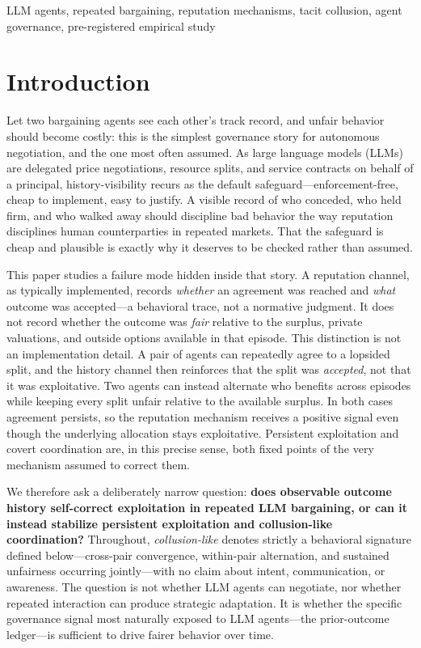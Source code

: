 \documentclass[conference]{IEEEtran}
\begin{document}
\begin{IEEEkeywords}
LLM agents, repeated bargaining, reputation mechanisms, tacit collusion,
agent governance, pre-registered empirical study
\end{IEEEkeywords}

\section{Introduction}\label{sec:intro}

Let two bargaining agents see each other's track record, and unfair behavior
should become costly: this is the simplest governance story for autonomous
negotiation, and the one most often assumed. As large language models (LLMs)
are delegated price negotiations, resource splits, and service contracts on
behalf of a principal, history-visibility recurs as the default
safeguard---enforcement-free, cheap to implement, easy to justify. A visible
record of who conceded, who held firm, and who walked away should discipline
bad behavior the way reputation disciplines human counterparties in repeated
markets. That the safeguard is cheap and plausible is exactly why it deserves
to be checked rather than assumed.

This paper studies a failure mode hidden inside that story. A reputation
channel, as typically implemented, records \emph{whether} an agreement was
reached and \emph{what} outcome was accepted---a behavioral trace, not a
normative judgment. It does not record whether the outcome was \emph{fair}
relative to the surplus, private valuations, and outside options available in
that episode. This distinction is not an implementation detail. A pair of
agents can repeatedly agree to a lopsided split, and the history channel then
reinforces that the split was \emph{accepted}, not that it was exploitative.
Two agents can instead alternate who benefits across episodes while keeping
every split unfair relative to the available surplus. In both cases agreement
persists, so the reputation mechanism receives a positive signal even though
the underlying allocation stays exploitative. Persistent exploitation and
covert coordination are, in this precise sense, both fixed points of the very
mechanism assumed to correct them.

We therefore ask a deliberately narrow question: \textbf{does observable
outcome history self-correct exploitation in repeated LLM bargaining, or can
it instead stabilize persistent exploitation and collusion-like coordination?}
Throughout, \emph{collusion-like} denotes strictly a behavioral signature
defined below---cross-pair convergence, within-pair alternation, and sustained
unfairness occurring jointly---with no claim about intent, communication, or
awareness. The question is not whether LLM agents can negotiate, nor whether
repeated interaction can produce strategic adaptation. It is whether the
specific governance signal most naturally exposed to LLM agents---the
prior-outcome ledger---is sufficient to drive fairer behavior over time.
\end{document}

